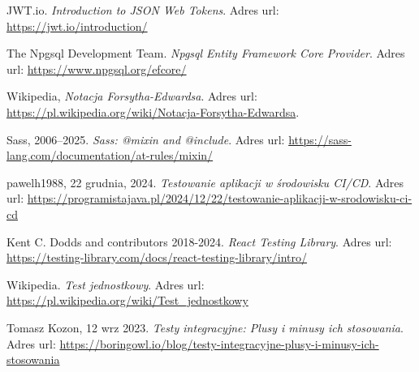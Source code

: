 \documentclass[twoside]{projektInzynierskiMS1}
\begin{document}
\begin{thebibliography}{99}
    JWT.io. \textit{Introduction to JSON Web Tokens}. Adres url: \url{https://jwt.io/introduction/}

    The Npgsql Development Team. \textit{Npgsql Entity Framework Core Provider}. Adres url:  \url{https://www.npgsql.org/efcore/}

    Wikipedia, \textit{Notacja Forsytha-Edwardsa}. Adres url: \url{https://pl.wikipedia.org/wiki/Notacja-Forsytha-Edwardsa}.

    Sass, 2006–2025. \textit{Sass: @mixin and @include}. Adres url: \url{https://sass-lang.com/documentation/at-rules/mixin/}

    pawelh1988, 22 grudnia, 2024. \textit{Testowanie aplikacji w środowisku CI/CD}. Adres url: \url{https://programistajava.pl/2024/12/22/testowanie-aplikacji-w-srodowisku-ci-cd}

    Kent C. Dodds and contributors 2018-2024. \textit{React Testing Library}. Adres url: \url{https://testing-library.com/docs/react-testing-library/intro/}

    Wikipedia. \textit{Test jednostkowy}. Adres url: \url{https://pl.wikipedia.org/wiki/Test_jednostkowy}

    Tomasz Kozon, 12 wrz 2023. \textit{Testy integracyjne: Plusy i minusy ich stosowania}. Adres url: \url{https://boringowl.io/blog/testy-integracyjne-plusy-i-minusy-ich-stosowania}

\end{thebibliography}
    
\end{document}
